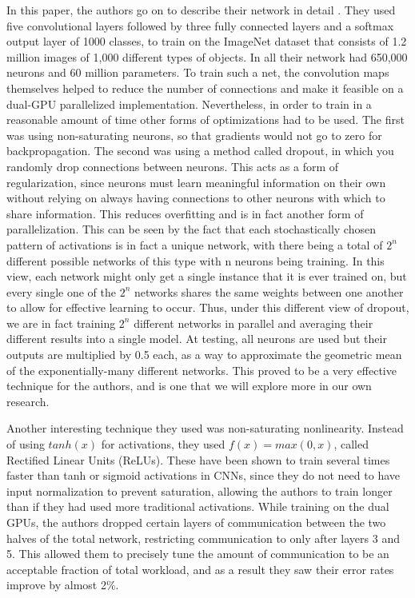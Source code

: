 \documentclass[12pt]{article}  %
\begin{document}
In this paper, the authors go on to describe their network in detail \cite{NIPS2012_4824}.  They used five convolutional layers followed by three fully connected layers and a softmax output layer of 1000 classes, to train on the ImageNet dataset that consists of 1.2 million images of 1,000 different types of objects.  In all their network had 650,000 neurons and 60 million parameters.  To train such a net, the convolution maps themselves helped to reduce the number of connections and make it feasible on a dual-GPU parallelized implementation.  Nevertheless, in order to train in a reasonable amount of time other forms of optimizations had to be used.  The first was using non-saturating neurons, so that gradients would not go to zero for backpropagation.  The second was using a method called dropout, in which you randomly drop connections between neurons.  This acts as a form of regularization, since neurons must learn meaningful information on their own without relying on always having connections to other neurons with which to share information.  This reduces overfitting and is in fact another form of parallelization.  This can be seen by the fact that each stochastically chosen pattern of activations is in fact a unique network, with there being a total of $2^n$ different possible networks of this type with n neurons being training.  In this view, each network might only get a single instance that it is ever trained on, but every single one of the $2^n$ networks shares the same weights between one another to allow for effective learning to occur.  Thus, under this different view of dropout, we are in fact training $2^n$ different networks in parallel and averaging their different results into a single model.  At testing, all neurons are used but their outputs are multiplied by 0.5 each, as a way to approximate the geometric mean of the exponentially-many different networks.  This proved to be a very effective technique for the authors, and is one that we will explore more in our own research.      

Another interesting technique they used was non-saturating nonlinearity.  Instead of using $tanh(x)$ for activations, they used $ f(x)=max(0,x)$, called Rectified Linear Units (ReLUs).  These have been shown to train several times faster than tanh or sigmoid activations in CNNs, since they do not need to have input normalization to prevent saturation, allowing the authors to train longer than if they had used more traditional activations.  While training on the dual GPUs, the authors dropped certain layers of communication between the two halves of the total network, restricting communication to only after layers 3 and 5.  This allowed them to precisely tune the amount of communication to be an acceptable fraction of total workload, and as a result they saw their error rates improve by almost 2\%.    
\end{document}
